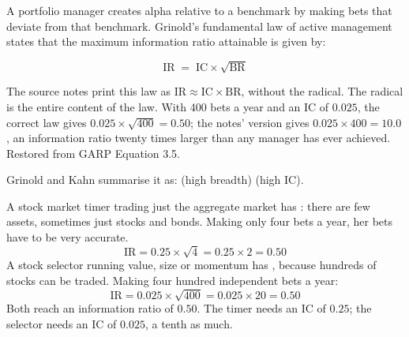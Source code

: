 
A portfolio manager creates alpha relative to a benchmark by making bets that
deviate from that benchmark. Grinold's fundamental law of active management
states that the maximum information ratio attainable is given by:

\begin{imfmlbox}
\[ \text{IR} \;=\; \text{IC} \times \sqrt{\text{BR}} \]
\end{imfmlbox}

\begin{imtrapbox}[breakable=false,title={A dropped square root}]
The source notes print this law as $\text{IR} \approx \text{IC} \times
\text{BR}$, without the radical. The radical is the entire content of the law.
With 400 bets a year and an IC of $0.025$, the correct law gives
$0.025 \times \sqrt{400} = 0.50$; the notes' version gives
$0.025 \times 400 = 10.0$, an information ratio twenty times larger than any
manager has ever achieved. Restored from GARP Equation 3.5.
\end{imtrapbox}

Grinold and Kahn summarise it as:  (high
breadth)  (high IC).

\gapbadge
{}

\begin{imexbox}[title={Two managers, the same information ratio}]
A stock market timer trading just the aggregate market has :
there are few assets, sometimes just stocks and bonds. Making only four bets a
year, her bets have to be very accurate.
\[ \text{IR} = 0.25 \times \sqrt{4} = 0.25 \times 2 = 0.50 \]
A stock selector running value, size or momentum has ,
because hundreds of stocks can be traded. Making four hundred independent bets a
year:
\[ \text{IR} = 0.025 \times \sqrt{400} = 0.025 \times 20 = 0.50 \]
Both reach an information ratio of $0.50$. The timer needs an IC of $0.25$; the
selector needs an IC of $0.025$, a tenth as much.
\end{imexbox}

